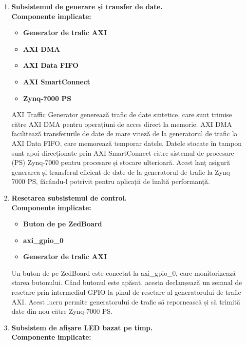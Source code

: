 \documentclass[12pt]{article}
\begin{document}
\begin{enumerate}
    \item \textbf{Subsistemul de generare și transfer de date.} \\
    \textbf{Componente implicate:}
        \begin{itemize}
            \item \textbf{Generator de trafic AXI}
            \item \textbf{AXI DMA}
            \item \textbf{AXI Data FIFO}
            \item \textbf{AXI SmartConnect}
            \item \textbf{Zynq-7000 PS}
        \end{itemize}
    \hspace*{1cm}AXI Traffic Generator generează trafic de date sintetice, care sunt trimise către AXI DMA pentru operațiuni de acces direct la memorie. AXI DMA facilitează transferurile de date de mare viteză de la generatorul de trafic la AXI Data FIFO, care memorează temporar datele. Datele stocate în tampon sunt apoi direcționate prin AXI SmartConnect către sistemul de procesare (PS) Zynq-7000 pentru procesare și stocare ulterioară. Acest lanț asigură generarea și transferul eficient de date de la generatorul de trafic la Zynq-7000 PS, făcându-l potrivit pentru aplicații de înaltă performanță.
    \item \textbf{Resetarea subsistemul de control.} \\
    \textbf{Componente implicate:}
        \begin{itemize}
            \item \textbf{Buton de pe ZedBoard}
            \item \textbf{axi\_gpio\_0}
            \item \textbf{Generator de trafic AXI}
        \end{itemize}
    \hspace*{1cm}Un buton de pe ZedBoard este conectat la axi\_gpio\_0, care monitorizează starea butonului. Când butonul este apăsat, acesta declanșează un semnal de resetare prin intermediul GPIO la pinul de resetare al generatorului de trafic AXI. Acest lucru permite generatorului de trafic să repornească și să trimită date din nou către Zynq-7000 PS.
    \item \textbf{Subsistem de afișare LED bazat pe timp.} \\
    \textbf{Componente implicate:}
        \begin{itemize}

\end{itemize}
\end{enumerate}
\end{document}

